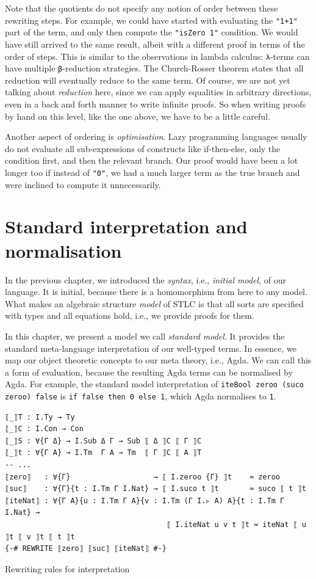 Note that the quotients do not specify any notion of order between these rewriting steps. For example, we could have started with evaluating the \verb$"1+1"$ part of the term, and only then compute the \verb$"isZero 1"$ condition. We would have still arrived to the same result, albeit with a different proof in terms of the order of steps. This is similar to the observations in lambda calculus: \verb$λ$-terms can have multiple \verb$β$-reduction strategies. The Church-Rosser theorem states that all reduction will eventually reduce to the same term. Of course, we are not yet talking about \textit{reduction} here, since we can apply equalities in arbitrary directions, even in a back and forth manner to write infinite proofs. So when writing proofs by hand on this level, like the one above, we have to be a little careful.

Another aspect of ordering is \textit{optimisation}. Lazy programming languages usually do not evaluate all sub-expressions of constructs like if-then-else, only the condition first, and then the relevant branch. Our proof would have been a lot longer too if instead of \verb$"0"$, we had a much larger term as the true branch and were inclined to compute it unnecessarily.

\section{Standard interpretation and normalisation} \label{sec:normalisation}

In the previous chapter, we introduced the \textit{syntax}, i.e., \textit{initial model}, of our language. It is initial, because there is a homomorphism from here to any model. What makes an algebraic structure \textit{model} of STLC is that all sorts are specified with types and all equations hold, i.e., we provide proofs for them.

In this chapter, we present a model we call \textit{standard model}. It provides the standard meta-language interpretation of our well-typed terms. In essence, we map our object theoretic concepts to our meta theory, i.e., Agda. We can call this a form of evaluation, because the resulting Agda terms can be normalised by Agda. For example, the standard model interpretation of \verb$iteBool zeroo (suco zeroo) false$ is \verb$if false then 0 else 1$, which Agda normalises to \verb$1$.

\begin{listing}[H]
\begin{verbatim}
⟦_⟧T : I.Ty → Ty
⟦_⟧C : I.Con → Con
⟦_⟧S : ∀{Γ Δ} → I.Sub Δ Γ → Sub ⟦ Δ ⟧C ⟦ Γ ⟧C
⟦_⟧t : ∀{Γ A} → I.Tm  Γ A → Tm  ⟦ Γ ⟧C ⟦ A ⟧T
-- ...
⟦zero⟧   : ∀{Γ}                   → ⟦ I.zeroo {Γ} ⟧t    ≈ zeroo
⟦suc⟧    : ∀{Γ}{t : I.Tm Γ I.Nat} → ⟦ I.suco t ⟧t       ≈ suco ⟦ t ⟧t
⟦iteNat⟧ : ∀{Γ A}{u : I.Tm Γ A}{v : I.Tm (Γ I.▹ A) A}{t : I.Tm Γ I.Nat} →
                                     ⟦ I.iteNat u v t ⟧t ≈ iteNat ⟦ u ⟧t ⟦ v ⟧t ⟦ t ⟧t
{-# REWRITE ⟦zero⟧ ⟦suc⟧ ⟦iteNat⟧ #-}
\end{verbatim}
\caption{Rewriting rules for interpretation}
\label{code:ot-rewriting}
\end{listing}

